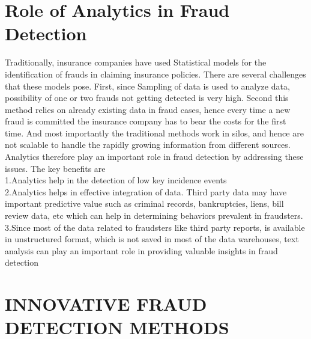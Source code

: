 \documentclass[sigconf]{acmart}
\begin{document}
\section{Role of Analytics in Fraud Detection} 
Traditionally, insurance companies have used Statistical models for the identification of frauds in claiming insurance policies. There are several challenges that these models pose. First, since Sampling of data is used to analyze data, possibility of one or two frauds not getting detected is very high. Second this method relies on already existing data in fraud cases, hence every time a new fraud is committed the insurance company has to bear the costs for the first time. And most importantly the traditional methods work in silos, and hence are not scalable to handle the rapidly growing information from different sources. Analytics therefore play an important role in fraud detection by addressing these issues. The key benefits are\\
1.Analytics help in the detection of low key incidence events \\
2.Analytics helps in effective integration of data. Third party data may have important predictive value such as criminal records, bankruptcies, liens, bill review data, etc which can help in determining behaviors prevalent in fraudsters.\\
3.Since most of the data related to fraudsters like third party reports, is available in unstructured format, which is not saved in most of the data warehouses, text analysis can play an important role in providing valuable insights in fraud detection\cite{link7}

\section{INNOVATIVE FRAUD DETECTION METHODS}
\end{document}
